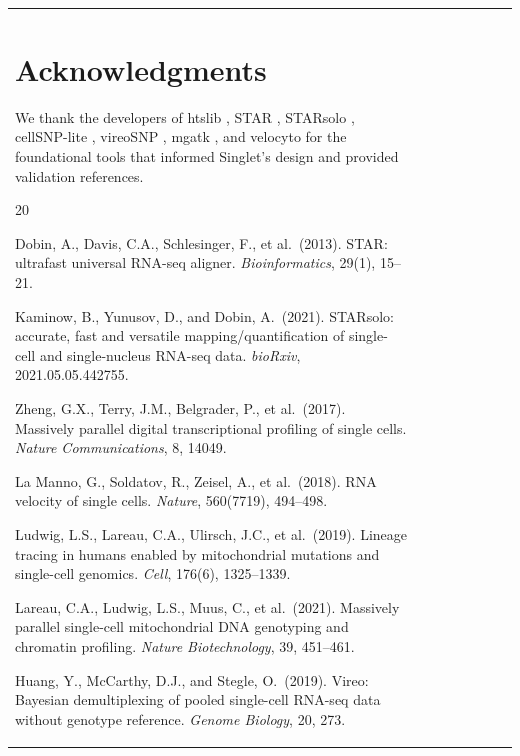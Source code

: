\documentclass[11pt,a4paper]{article}
\begin{document}
\begin{table}[t]
\begin{tabular}{llllrrrr}
{%
\section*{Acknowledgments}

We thank the developers of htslib \citep{danecek2021twelve}, STAR \citep{dobin2013star}, STARsolo \citep{kaminow2021starsolo}, cellSNP-lite \citep{huang2021cellsnp}, vireoSNP \citep{huang2019vireo}, mgatk \citep{lareau2021mgatk}, and velocyto \citep{la2018rna} for the foundational tools that informed Singlet's design and provided validation references.

\begin{thebibliography}{20}

\bibitem[Dobin et al.(2013)]{dobin2013star}
Dobin, A., Davis, C.A., Schlesinger, F., et al.\ (2013).
STAR: ultrafast universal RNA-seq aligner.
\textit{Bioinformatics}, 29(1), 15--21.

\bibitem[Kaminow et al.(2021)]{kaminow2021starsolo}
Kaminow, B., Yunusov, D., and Dobin, A.\ (2021).
STARsolo: accurate, fast and versatile mapping/quantification of single-cell and single-nucleus RNA-seq data.
\textit{bioRxiv}, 2021.05.05.442755.

\bibitem[Zheng et al.(2017)]{zheng2017massively}
Zheng, G.X., Terry, J.M., Belgrader, P., et al.\ (2017).
Massively parallel digital transcriptional profiling of single cells.
\textit{Nature Communications}, 8, 14049.

\bibitem[La Manno et al.(2018)]{la2018rna}
La Manno, G., Soldatov, R., Zeisel, A., et al.\ (2018).
RNA velocity of single cells.
\textit{Nature}, 560(7719), 494--498.

\bibitem[Ludwig et al.(2019)]{ludwig2019lineage}
Ludwig, L.S., Lareau, C.A., Ulirsch, J.C., et al.\ (2019).
Lineage tracing in humans enabled by mitochondrial mutations and single-cell genomics.
\textit{Cell}, 176(6), 1325--1339.

\bibitem[Lareau et al.(2021)]{lareau2021mgatk}
Lareau, C.A., Ludwig, L.S., Muus, C., et al.\ (2021).
Massively parallel single-cell mitochondrial DNA genotyping and chromatin profiling.
\textit{Nature Biotechnology}, 39, 451--461.

\bibitem[Huang et al.(2019)]{huang2019vireo}
Huang, Y., McCarthy, D.J., and Stegle, O.\ (2019).
Vireo: Bayesian demultiplexing of pooled single-cell RNA-seq data without genotype reference.
\textit{Genome Biology}, 20, 273.


\end{thebibliography}}
\end{tabular}
\end{table}
\end{document}
